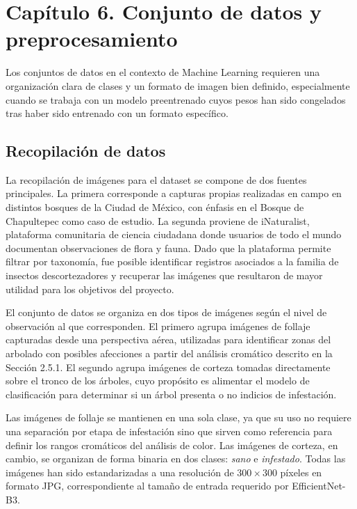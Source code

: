 \newpage
\section*{Capítulo 6. Conjunto de datos y preprocesamiento}

Los conjuntos de datos en el contexto de Machine Learning requieren una organización clara de clases y un formato de imagen bien definido, especialmente cuando se trabaja con un modelo preentrenado cuyos pesos han sido congelados tras haber sido entrenado con un formato específico.

\setcounter{section}{6}
\setcounter{subsection}{0}

\subsection{Recopilación de datos}

La recopilación de imágenes para el dataset se compone de dos fuentes principales. La primera corresponde a capturas propias realizadas en campo en distintos bosques de la Ciudad de México, con énfasis en el Bosque de Chapultepec como caso de estudio. La segunda proviene de iNaturalist, plataforma comunitaria de ciencia 
ciudadana donde usuarios de todo el mundo documentan observaciones de flora y fauna. Dado que la plataforma permite filtrar por taxonomía, fue posible identificar registros asociados a la familia de insectos descortezadores y recuperar las imágenes que resultaron de mayor utilidad para los objetivos del proyecto.

El conjunto de datos se organiza en dos tipos de imágenes según el nivel de observación al que corresponden. El primero agrupa imágenes de follaje capturadas desde una perspectiva aérea, utilizadas para identificar zonas del arbolado con posibles afecciones a partir del análisis cromático descrito en la Sección 2.5.1. El segundo agrupa imágenes de corteza tomadas directamente sobre el tronco de los 
árboles, cuyo propósito es alimentar el modelo de clasificación para determinar si un árbol presenta o no indicios de infestación.

Las imágenes de follaje se mantienen en una sola clase, ya que su uso no requiere una separación por etapa de infestación sino que sirven como referencia para definir los rangos cromáticos del análisis de color. Las imágenes de corteza, en cambio, se organizan de forma binaria en dos clases: \textit{sano} e \textit{infestado}. Todas las imágenes han sido estandarizadas a una resolución de $300 \times 300$ píxeles en formato JPG, correspondiente al tamaño de entrada requerido por EfficientNet-B3.